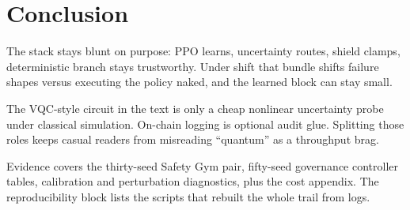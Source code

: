 \section{Conclusion}

The stack stays blunt on purpose: PPO learns, uncertainty routes, shield clamps, deterministic branch stays trustworthy. Under shift that bundle shifts failure shapes versus executing the policy naked, and the learned block can stay small.

The VQC-style circuit in the text is only a cheap nonlinear uncertainty probe under classical simulation. On-chain logging is optional audit glue. Splitting those roles keeps casual readers from misreading ``quantum'' as a throughput brag.

Evidence covers the thirty-seed Safety Gym pair, fifty-seed governance controller tables, calibration and perturbation diagnostics, plus the cost appendix. The reproducibility block lists the scripts that rebuilt the whole trail from logs.
